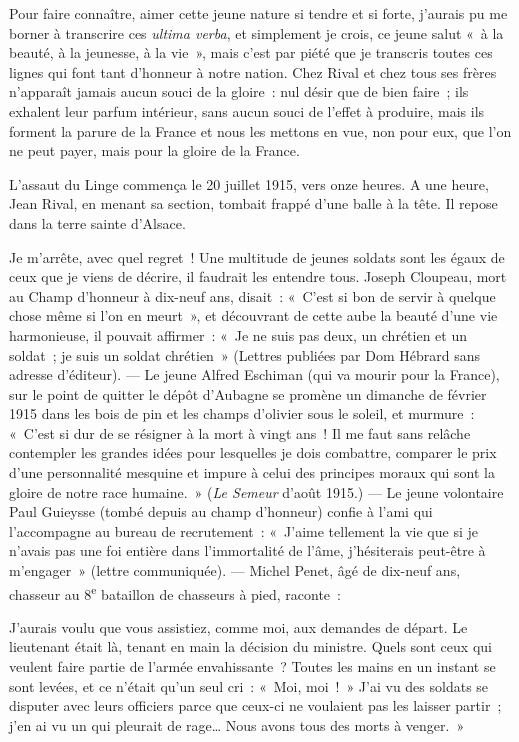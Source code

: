 \documentclass[french,twoside]{book} %
\newenvironment{quoteblock}%
  {\begin{quoting}}
  {\end{quoting}}
\newenvironment{quotebar}{%
    \def\FrameCommand{{\color{rubric!10!}\vrule width 0.5em} \hspace{0.9em}}%
    \def\OuterFrameSep{\itemsep} %
    \MakeFramed {\advance\hsize-\width \FrameRestore}
  }%
  {%
    \endMakeFramed
  }
\renewenvironment{quoteblock}%
  {%
    \savenotes
    \setstretch{0.9}
    \normalfont
    \begin{quotebar}
  }
  {%
    \end{quotebar}
    \spewnotes
  }
\begin{document}
\noindent Pour faire connaître, aimer cette jeune nature si tendre et si forte, j’aurais pu me borner à transcrire ces {\itshape ultima verba}, et simplement je crois, ce jeune salut « à la beauté, à la jeunesse, à la vie », mais c’est par piété que je transcris toutes ces lignes qui font tant d’honneur à notre nation. Chez Rival et chez tous ses frères n’apparaît jamais aucun souci de la gloire : nul désir que de bien faire ; ils exhalent leur parfum intérieur, sans aucun souci de l’effet à produire, mais ils forment la parure de la France et nous les mettons en vue, non pour eux, que l’on ne peut payer, mais pour la gloire de la France.‌\par
L’assaut du Linge commença le 20 juillet 1915, vers onze heures. A une heure, Jean Rival, en menant sa section, tombait frappé d’une balle à la tête. Il repose dans la terre sainte d’Alsace.‌\par
Je m’arrête, avec quel regret ! Une multitude de jeunes soldats sont les égaux de ceux que je viens de décrire, il faudrait les entendre tous. Joseph Cloupeau, mort au Champ d’honneur à dix-neuf ans, disait : « C’est si bon de servir à quelque chose même si l’on en meurt », et découvrant de cette aube la beauté d’une vie harmonieuse, il pouvait affirmer : « Je ne suis pas deux, un chrétien et un soldat ; je suis un soldat chrétien » (Lettres publiées par Dom Hébrard sans adresse d’éditeur). — Le jeune Alfred Eschiman (qui va mourir pour la France), sur le point de quitter le dépôt d’Aubagne se promène un dimanche de février 1915 dans les bois de pin et les champs d’olivier sous le soleil, et murmure : « C’est si dur de se résigner à la mort à vingt ans ! Il me faut sans relâche contempler les grandes idées pour lesquelles je dois combattre, comparer le prix d’une personnalité mesquine et impure à celui des principes moraux qui sont la gloire de notre race humaine. » ({\itshape Le Semeur} d’août 1915.) — Le jeune volontaire Paul Guieysse (tombé depuis au champ d’honneur) confie à l’ami qui l’accompagne au bureau de recrutement : « J’aime tellement la vie que si je n’avais pas une foi entière dans l’immortalité de l’âme, j’hésiterais peut-être à m’engager » (lettre communiquée). — Michel Penet, âgé de dix-neuf ans, chasseur au 8\textsuperscript{e} bataillon de chasseurs à pied, raconte :‌\par

\begin{quoteblock}
 \noindent J’aurais voulu que vous assistiez, comme moi, aux demandes de départ. Le lieutenant était là, tenant en main la décision du ministre. Quels sont ceux qui veulent faire partie de l’armée envahissante ? Toutes les mains en un instant se sont levées, et ce n’était qu’un seul cri : « Moi, moi ! » J’ai vu des soldats se disputer avec leurs officiers parce que ceux-ci ne voulaient pas les laisser partir ; j’en ai vu un qui pleurait de rage… Nous avons tous des morts à venger. »‌
 \end{quoteblock}
\end{document}
